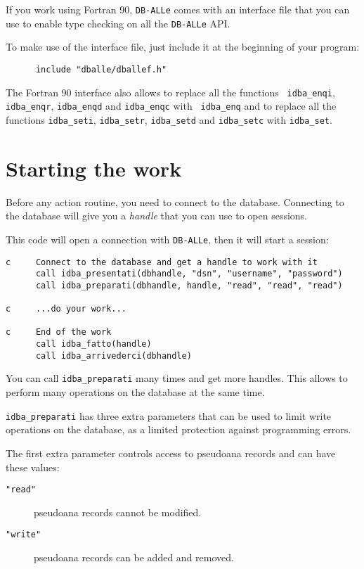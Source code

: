 \documentclass[final,12pt,a4paper,twoside]{book}
\newcommand{\dballe}{{\tt DB-ALLe}}
\begin{document}
If you work using Fortran 90, \dballe{} comes with an interface file that you
can use to enable type checking on all the \dballe{} API.

To make use of the interface file, just include it at the beginning of your
program:

\begin{verbatim}
      include "dballe/dballef.h"
\end{verbatim}

The Fortran 90 interface also allows to replace all the functions {\tt
idba\_enqi}, {\tt idba\_enqr}, {\tt idba\_enqd} and {\tt idba\_enqc} with {\tt
idba\_enq} and to replace all the functions {\tt idba\_seti}, {\tt idba\_setr},
{\tt idba\_setd} and {\tt idba\_setc} with {\tt idba\_set}.

\section{Starting the work}

Before any action routine, you need to connect to the database.  Connecting to
the database will give you a \emph{handle} that you can use to open sessions.

This code will open a connection with \dballe{}, then it will start a session:

\label{fun-idba_presentati}
\label{fun-idba_preparati}

\begin{verbatim}
c     Connect to the database and get a handle to work with it
      call idba_presentati(dbhandle, "dsn", "username", "password")
      call idba_preparati(dbhandle, handle, "read", "read", "read")

c     ...do your work...

c     End of the work
      call idba_fatto(handle)
      call idba_arrivederci(dbhandle)
\end{verbatim}

You can call {\tt idba\_preparati} many times and get more handles.  This allows
to perform many operations on the database at the same time.

{\tt idba\_preparati} has three extra parameters that can be used to limit
write operations on the database, as a limited protection against programming
errors.

The first extra parameter controls access to pseudoana records and can have
these values:

\begin{description}
\item[{\tt "read"}] pseudoana records cannot be modified.
\item[{\tt "write"}] pseudoana records can be added and removed.
\end{description}
\end{document}
